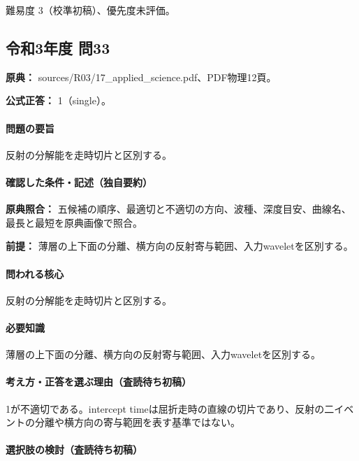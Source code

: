 \par 難易度 3（校準初稿）、優先度未評価。

\subsection{令和3年度 問33}
\label{q:r03-reg-applied-33}

\noindent\textbf{原典：} sources/R03/17\_applied\_science.pdf、PDF物理12頁。

\textbf{公式正答：} 1（single）。

\paragraph{問題の要旨} 反射の分解能を走時切片と区別する。

\paragraph{確認した条件・記述（独自要約）}\mbox{}\par

\noindent\textbf{原典照合：} 五候補の順序、最適切と不適切の方向、波種、深度目安、曲線名、最長と最短を原典画像で照合。\par

\noindent\textbf{前提：} 薄層の上下面の分離、横方向の反射寄与範囲、入力waveletを区別する。\par

\paragraph{問われる核心} 反射の分解能を走時切片と区別する。

\paragraph{必要知識} 薄層の上下面の分離、横方向の反射寄与範囲、入力waveletを区別する。

\paragraph{考え方・正答を選ぶ理由（査読待ち初稿）} 1が不適切である。intercept timeは屈折走時の直線の切片であり、反射の二イベントの分離や横方向の寄与範囲を表す基準ではない。

\paragraph{選択肢の検討（査読待ち初稿）}\mbox{}\par

